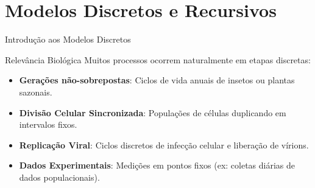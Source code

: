 \section{Modelos Discretos e Recursivos}

\begin{frame}[allowframebreaks]{Introdução aos Modelos Discretos}

\begin{block}{Relevância Biológica}
Muitos processos ocorrem naturalmente em etapas discretas:
\begin{itemize}
    \item \textbf{Gerações não-sobrepostas}: Ciclos de vida anuais de insetos ou plantas sazonais.
    \item \textbf{Divisão Celular Sincronizada}: Populações de células duplicando em intervalos fixos.
    \item \textbf{Replicação Viral}: Ciclos discretos de infecção celular e liberação de vírions.
    \item \textbf{Dados Experimentais}: Medições em pontos fixos (ex: coletas diárias de dados populacionais).
\end{itemize}
\end{block}
\end{frame}

